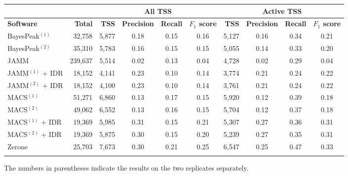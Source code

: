 \documentclass{bioinfo}
\begin{document}
\begin{table}[!tbp]
{\begin{tabular}{lr|rccc|rccc}
        \multicolumn{2}{c}{} & \multicolumn{4}{c}{\textbf{All TSS}} & \multicolumn{4}{c}{\textbf{Active TSS}} \\
        \midrule
        \textbf{Software} & \textbf{Total} &
        \textbf{TSS} & \textbf{Precision} & \textbf{Recall} & \textbf{$F_{1}$ score} &
        \textbf{TSS} & \textbf{Precision} & \textbf{Recall} & \textbf{$F_{1}$ score} \\
        \midrule
        BayesPeak$^{(1)}$  &  32,758 & 5,877 & 0.18 & 0.15 & 0.16 & 5,127 & 0.16 & 0.34 & 0.21 \\
        BayesPeak$^{(2)}$  &  35,310 & 5,783 & 0.16 & 0.15 & 0.15 & 5,055 & 0.14 & 0.33 & 0.20 \\
        JAMM               & 239,637 & 5,514 & 0.02 & 0.13 & 0.04 & 4,728 & 0.02 & 0.29 & 0.04 \\
        JAMM$^{(1)}$ + IDR &  18,152 & 4,141 & 0.23 & 0.10 & 0.14 & 3,774 & 0.21 & 0.24 & 0.22 \\
        JAMM$^{(2)}$ + IDR &  18,152 & 4,100 & 0.23 & 0.10 & 0.14 & 3,761 & 0.21 & 0.24 & 0.22 \\
        MACS$^{(1)}$       &  51,271 & 6,860 & 0.13 & 0.17 & 0.15 & 5,920 & 0.12 & 0.39 & 0.18 \\
        MACS$^{(2)}$       &  49,062 & 6,552 & 0.13 & 0.16 & 0.15 & 5,704 & 0.12 & 0.37 & 0.18 \\
        MACS$^{(1)}$ + IDR &  19,369 & 5,985 & 0.31 & 0.15 & 0.21 & 5,307 & 0.27 & 0.36 & 0.31 \\
        MACS$^{(2)}$ + IDR &  19,369 & 5,875 & 0.30 & 0.15 & 0.20 & 5,239 & 0.27 & 0.35 & 0.31 \\
        Zerone             &  25,703 & 7,673 & 0.30 & 0.21 & 0.25 & 6,547 & 0.25 & 0.47 & 0.33 \\
        \botrule
\end{tabular}}{The numbers in parentheses indicate the results on the two
replicates separately.}
\end{table}
\end{document}
